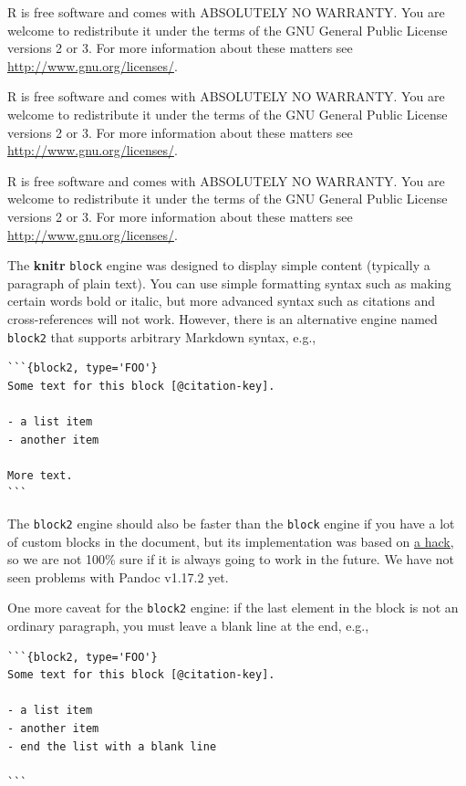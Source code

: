 \documentclass[doctor,openright,twoside]{sjtuthesis}
\newcommand{\passthrough}[1]{#1}
\theoremstyle{plain}
\theoremstyle{definition}
\theoremstyle{remark}
\theoremstyle{ocrenumbox}
\theoremstyle{plain}
\let\BeginKnitrBlock\begin \let\EndKnitrBlock\end
\begin{document}
\BeginKnitrBlock{rmdimportant}
R is free software and comes with ABSOLUTELY NO WARRANTY. You are
welcome to redistribute it under the terms of the GNU General Public
License versions 2 or 3. For more information about these matters see
\url{http://www.gnu.org/licenses/}.
\EndKnitrBlock{rmdimportant}

\BeginKnitrBlock{rmdtip}
R is free software and comes with ABSOLUTELY NO WARRANTY. You are
welcome to redistribute it under the terms of the GNU General Public
License versions 2 or 3. For more information about these matters see
\url{http://www.gnu.org/licenses/}.
\EndKnitrBlock{rmdtip}

\BeginKnitrBlock{rmdwarning}
R is free software and comes with ABSOLUTELY NO WARRANTY. You are
welcome to redistribute it under the terms of the GNU General Public
License versions 2 or 3. For more information about these matters see
\url{http://www.gnu.org/licenses/}.
\EndKnitrBlock{rmdwarning}

The \textbf{knitr} \passthrough{\lstinline!block!} engine was designed
to display simple content (typically a paragraph of plain text). You can
use simple formatting syntax such as making certain words bold or
italic, but more advanced syntax such as citations and cross-references
will not work. However, there is an alternative engine named
\passthrough{\lstinline!block2!} that supports arbitrary Markdown
syntax, e.g.,

\begin{lstlisting}
```{block2, type='FOO'}
Some text for this block [@citation-key].

- a list item
- another item

More text.
```
\end{lstlisting}

The \passthrough{\lstinline!block2!} engine should also be faster than
the \passthrough{\lstinline!block!} engine if you have a lot of custom
blocks in the document, but its implementation was based on
\href{https://github.com/jgm/pandoc/issues/2453}{a hack,} so we are not
100\% sure if it is always going to work in the future. We have not seen
problems with Pandoc v1.17.2 yet.

One more caveat for the \passthrough{\lstinline!block2!} engine: if the
last element in the block is not an ordinary paragraph, you must leave a
blank line at the end, e.g.,

\begin{lstlisting}
```{block2, type='FOO'}
Some text for this block [@citation-key].

- a list item
- another item
- end the list with a blank line

```
\end{lstlisting}
\end{document}
